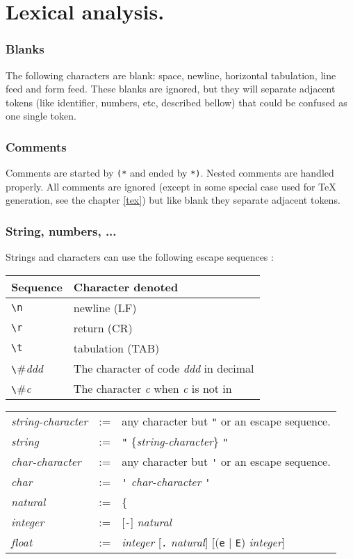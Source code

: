 \section{Lexical analysis.}

\subsubsection*{Blanks} The following characters are blank: space, newline,
  horizontal tabulation, line feed and form feed. These blanks are ignored, but
  they will separate adjacent tokens (like identifier, numbers, etc, described
  bellow) that could be confused as one single token.

\subsubsection*{Comments} Comments are started by \verb#(*# and ended by
\verb#*)#. Nested comments are handled properly. All comments are ignored
(except in some special case used for TeX generation, see the chapter
\ref{tex}) but like blank they separate adjacent tokens.

\subsubsection*{String, numbers, ...}

Strings and characters can use the following escape sequences :
\begin{center}
\begin{tabular}{|l|l|}
\hline
Sequence & Character denoted \\
\hline
\verb#\n# & newline (LF) \\
\verb#\r# & return (CR) \\
\verb#\t# & tabulation (TAB) \\
\verb#\#{\it ddd} & The character of code {\it ddd} in decimal  \\
\verb#\#{\it c} & The character {\it c} when {\it c} is not in \verb#0...9nbt# \\
\hline
\end{tabular}
\end{center}

\begin{tabular}{lcl}
{\it string-character} &:=& any character but \verb#"#
                            or an escape sequence.\\
{\it string} &:=& \verb#"# \{{\it string-character}\} \verb#"#\\
{\it char-character} &:=& any character but \verb#'#
                          or an escape sequence.\\
{\it char} &:=& \verb#'# {\it char-character} \verb#'#\\
{\it natural} &:=& \{ \verb#0...9# \}$_+$\\
{\it integer} &:=& [\verb#-#] {\it natural}\\
{\it float} &:=& {\it integer} [\verb#.# {\it natural}]
                             [(\verb#e# $|$ \verb#E#) {\it integer}]
\end{tabular}


